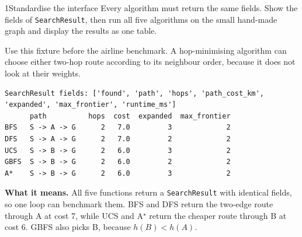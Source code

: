 \begin{labquestion}{1}{Standardise the interface}
Every algorithm must return the same fields. Show the fields of \texttt{SearchResult}, then run all five algorithms on the small hand-made graph and display the results as one table.
\end{labquestion}
\begin{labanswer}

Use this fixture before the airline benchmark. A hop-minimising algorithm can choose either two-hop route according to its neighbour order, because it does not look at their weights.



\begin{refoutput}
\begin{lstlisting}[style=utpterminal]
SearchResult fields: ['found', 'path', 'hops', 'path_cost_km', 'expanded', 'max_frontier', 'runtime_ms']
      path          hops  cost  expanded  max_frontier
BFS   S -> A -> G      2   7.0         3             2
DFS   S -> A -> G      2   7.0         2             2
UCS   S -> B -> G      2   6.0         3             2
GBFS  S -> B -> G      2   6.0         2             2
A*    S -> B -> G      2   6.0         3             2
\end{lstlisting}
\end{refoutput}

\textbf{What it means.} All five functions return a \texttt{SearchResult} with identical fields, so one loop can benchmark them. BFS and DFS return the two-edge route through A at cost 7, while UCS and A$^\star$ return the cheaper route through B at cost 6. GBFS also picks B, because $h(B) < h(A)$.
\end{labanswer}

